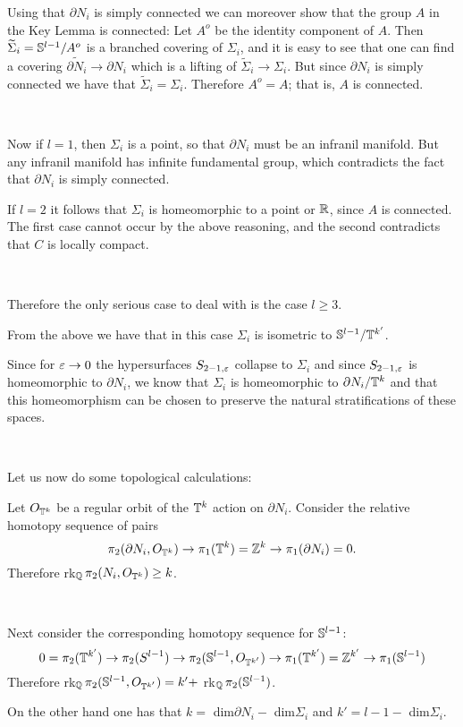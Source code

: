 Using that $\partial N_i$ is simply connected we can moreover show that 
the group $A$ in the Key Lemma is connected:
Let $A^o$ be the identity component of $A$.
Then
$\widetilde \Sigma_i={\Bbb S}^{l-1}/A^o$ is a branched covering of
$\Sigma_i$, 
and it is easy to see that one can find
a covering $\widetilde {\partial N_i}\to \partial N_i$ which is a lifting of
$\widetilde \Sigma_i\to\Sigma_i$. But since $\partial N_i$ is simply connected
we have that $\widetilde \Sigma_i=\Sigma_i$. 
Therefore $A^o=A$; that is,
$A$ is connected.

\

Now if $l=1$, then $\Sigma_i$ is a point, so that $\partial N_i$ must be an 
infranil manifold. But any infranil manifold  
has infinite fundamental group, which contradicts the fact that 
$\partial N_i$ is simply connected.

If $l=2$ it follows that $\Sigma_i$ is 
homeomorphic to a point or ${\Bbb R}$, since $A$ is connected.
The first case cannot occur by the above reasoning, and the second 
contradicts that $C$ is locally compact.

\ 

Therefore the only serious case to deal with is the case $l\ge 3$.

From the above we have that in this case
$\Sigma_i$ is isometric to ${\Bbb S}^{l-1}/{\Bbb T}^{k'}$.


Since for $\varepsilon\to 0$ the hypersurfaces $S_{2-1,\varepsilon}$ collapse
to $\Sigma_i$ and since $S_{2-1,\varepsilon}$ is homeomorphic to $\partial N_i$,
we know that  $\Sigma_i$ is homeomorphic to $\partial N_i/{\Bbb T}^k$ and 
that this homeomorphism can be chosen to preserve the natural stratifications
of these spaces.

\

Let us now do some topological calculations: 
 

Let $O_{{\Bbb T}^k}$ be a regular orbit of the ${\Bbb T}^k$ action on $\partial N_i$.
Consider the relative homotopy sequence of pairs
$$ \pi_2(\partial N_i,O_{{\Bbb T}^k})\to \pi_1({\Bbb T}^k)={\Bbb Z}^k\to \pi_1(\partial N_i)=0.$$ 
Therefore rk$_{\Bbb Q}\,\pi_2(N_i,O_{{\Bbb T}^k})\ge k$. 

\
 
Next consider the corresponding homotopy sequence for ${\Bbb S}^{l-1}$:
$$0=\pi_2({\Bbb T}^{k'})\to \pi_2(S^{l-1})\to \pi_2({\Bbb S}^{l-1},O_{{\Bbb T}^{k'}})\to 
\pi_1({\Bbb T}^{k'})={\Bbb Z}^{k'}\to 
\pi_1({\Bbb S}^{l-1})$$ 
Therefore rk$_{\Bbb Q}\,\pi_2({\Bbb S}^{l-1},O_{{\Bbb T}^{k'}})=k'+$ 
rk$_{\Bbb Q}\,\pi_2({\Bbb S}^{l-1})$. 
 
On the other hand one has that $k=$ dim$\partial N_i-$ dim$\Sigma_i$ and 
$k'=l-1-$ dim$\Sigma_i$. 

